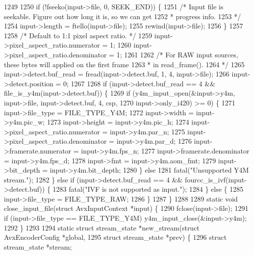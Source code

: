 \begin{DoxyCodeInclude}
{{{{{{{{{{{{{{{1249 
1250   \textcolor{keywordflow}{if} (!fseeko(input->file, 0, SEEK\_END)) \{
1251     \textcolor{comment}{/* Input file is seekable. Figure out how long it is, so we can get}
1252 \textcolor{comment}{     * progress info.}
1253 \textcolor{comment}{     */}
1254     input->length = ftello(input->file);
1255     rewind(input->file);
1256   \}
1257 
1258   \textcolor{comment}{/* Default to 1:1 pixel aspect ratio. */}
1259   input->pixel\_aspect\_ratio.numerator = 1;
1260   input->pixel\_aspect\_ratio.denominator = 1;
1261 
1262   \textcolor{comment}{/* For RAW input sources, these bytes will applied on the first frame}
1263 \textcolor{comment}{   *  in read\_frame().}
1264 \textcolor{comment}{   */}
1265   input->detect.buf\_read = fread(input->detect.buf, 1, 4, input->file);
1266   input->detect.position = 0;
1267 
1268   \textcolor{keywordflow}{if} (input->detect.buf\_read == 4 && file\_is\_y4m(input->detect.buf)) \{
1269     \textcolor{keywordflow}{if} (y4m\_input\_open(&input->y4m, input->file, input->detect.buf, 4, csp,
1270                        input->only\_i420) >= 0) \{
1271       input->file\_type = FILE\_TYPE\_Y4M;
1272       input->width = input->y4m.pic\_w;
1273       input->height = input->y4m.pic\_h;
1274       input->pixel\_aspect\_ratio.numerator = input->y4m.par\_n;
1275       input->pixel\_aspect\_ratio.denominator = input->y4m.par\_d;
1276       input->framerate.numerator = input->y4m.fps\_n;
1277       input->framerate.denominator = input->y4m.fps\_d;
1278       input->fmt = input->y4m.aom\_fmt;
1279       input->bit\_depth = input->y4m.bit\_depth;
1280     \} \textcolor{keywordflow}{else}
1281       fatal(\textcolor{stringliteral}{"Unsupported Y4M stream."});
1282   \} \textcolor{keywordflow}{else} \textcolor{keywordflow}{if} (input->detect.buf\_read == 4 && fourcc\_is\_ivf(input->detect.buf)) \{
1283     fatal(\textcolor{stringliteral}{"IVF is not supported as input."});
1284   \} \textcolor{keywordflow}{else} \{
1285     input->file\_type = FILE\_TYPE\_RAW;
1286   \}
1287 \}
1288 
1289 \textcolor{keyword}{static} \textcolor{keywordtype}{void} close\_input\_file(\textcolor{keyword}{struct} AvxInputContext *input) \{
1290   fclose(input->file);
1291   \textcolor{keywordflow}{if} (input->file\_type == FILE\_TYPE\_Y4M) y4m\_input\_close(&input->y4m);
1292 \}
1293 
1294 \textcolor{keyword}{static} \textcolor{keyword}{struct }stream\_state *new\_stream(\textcolor{keyword}{struct} AvxEncoderConfig *global,
1295                                        \textcolor{keyword}{struct} stream\_state *prev) \{
1296   \textcolor{keyword}{struct }stream\_state *stream;
}}}}}}}}}}}}}}}
\end{DoxyCodeInclude}
